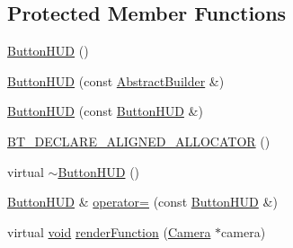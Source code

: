 \subsection*{Protected Member Functions}
\begin{DoxyCompactItemize}
\item 
\mbox{\hyperlink{classnjli_1_1_button_h_u_d_a506d6b5e9296d605dbb84a8a1f8866ef}{Button\+H\+UD}} ()
\item 
\mbox{\hyperlink{classnjli_1_1_button_h_u_d_a2bb41974899ae34203aaca05acb3fefb}{Button\+H\+UD}} (const \mbox{\hyperlink{classnjli_1_1_abstract_builder}{Abstract\+Builder}} \&)
\item 
\mbox{\hyperlink{classnjli_1_1_button_h_u_d_ac20c00ea9c089549275ac33f528ff5a4}{Button\+H\+UD}} (const \mbox{\hyperlink{classnjli_1_1_button_h_u_d}{Button\+H\+UD}} \&)
\item 
\mbox{\hyperlink{classnjli_1_1_button_h_u_d_ad157ec80fdc2bd473d02fa4adcf74bfa}{B\+T\+\_\+\+D\+E\+C\+L\+A\+R\+E\+\_\+\+A\+L\+I\+G\+N\+E\+D\+\_\+\+A\+L\+L\+O\+C\+A\+T\+OR}} ()
\item 
virtual \mbox{\hyperlink{classnjli_1_1_button_h_u_d_a8330cb4675664992c08c2dcba7e382e5}{$\sim$\+Button\+H\+UD}} ()
\item 
\mbox{\hyperlink{classnjli_1_1_button_h_u_d}{Button\+H\+UD}} \& \mbox{\hyperlink{classnjli_1_1_button_h_u_d_a4dec6cd3d342055256adf12caa8fd089}{operator=}} (const \mbox{\hyperlink{classnjli_1_1_button_h_u_d}{Button\+H\+UD}} \&)
\item 
virtual \mbox{\hyperlink{_thread_8h_af1e856da2e658414cb2456cb6f7ebc66}{void}} \mbox{\hyperlink{classnjli_1_1_button_h_u_d_add44501f95991324e5733c8bfc18f166}{render\+Function}} (\mbox{\hyperlink{classnjli_1_1_camera}{Camera}} $\ast$camera)
\end{DoxyCompactItemize}
